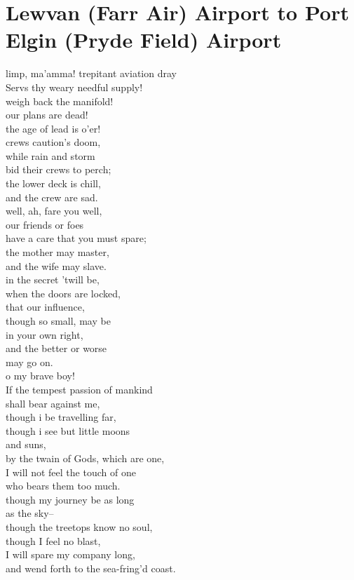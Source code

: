\documentclass[smalldemyvopaper,11pt,twoside,onecolumn,openright,extrafontsizes]{memoir}
\begin{document}
\chapter{Lewvan (Farr Air) Airport to Port Elgin (Pryde Field) Airport}
limp, ma'amma! trepitant aviation dray
\\Servs thy weary needful supply!
\\weigh back the manifold!
\\our plans are dead!
\\the age of lead is o'er!
\\crews caution's doom,
\\while rain and storm
\\bid their crews to perch;
\\the lower deck is chill,
\\and the crew are sad.
\\well, ah, fare you well,
\\our friends or foes
\\have a care that you must spare;
\\the mother may master,
\\and the wife may slave.
\\in the secret 'twill be,
\\when the doors are locked,
\\that our influence,
\\though so small, may be
\\in your own right,
\\and the better or worse
\\may go on.
\\o my brave boy!
\\If the tempest passion of mankind
\\shall bear against me,
\\though i be travelling far,
\\though i see but little moons
\\and suns,
\\by the twain of Gods, which are one,
\\I will not feel the touch of one
\\who bears them too much.
\\though my journey be as long
\\as the sky--
\\though the treetops know no soul,
\\though I feel no blast,
\\I will spare my company long,
\\and wend forth to the sea-fring'd coast.
\end{document}
